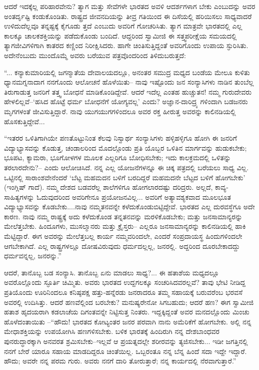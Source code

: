 ಆದರೆ ಇದಕ್ಕೆಲ್ಲ ಪರಿಹಾರವೇನು? ತ್ಯಾಗ ಮತ್ತು ಸೇವೆಗಳೇ ಭಾರತದ ಅವಳಿ ಆದರ್ಶಗಳಾಗ ಬೇಕು ಎಂಬುದನ್ನು ಅವರ ಅಂತರ್ದೃಷ್ಟಿ ಕಂಡುಕೊಂಡಿತು. ರಾಷ್ಟ್ರದ ಜೀವನದಿಯನ್ನು ತೀವ್ರ ಗತಿಯಿಂದ ಈ ದಿಸೆಯಲ್ಲಿ ಹರಿಯಿಸಲು ಸಾಧ್ಯವಾದರೆ ಉಳಿದುದೆಲ್ಲವೂ ತನ್ನಷ್ಟಕ್ಕೆ ಕೈಗೂಡು ತ್ತದೆ ಎಂಬುದು ಅವರಿಗೆ ಗೋಚರಿಸಿತು. ತ್ಯಾಗ ಮಾತ್ರವೇ ಭಾರತದಲ್ಲಿ ಎಲ್ಲ ಕಾಲಕ್ಕೂ ಚಾಲಕಶಕ್ತಿಯನ್ನು ಪಡೆದುಕೊಂಡು ಬಂದಿದೆ. ಆದ್ದರಿಂದ ಸ್ವಾಮೀಜಿ ಈ ಸತ್ತ್ವಪರೀಕ್ಷೆಯ ಸಮಯದಲ್ಲಿ ತ್ಯಾಗಜೀವಿಗಳಿಗಾಗಿ ಕಾತರದ ಕಣ್ಣಿಂದ ನಿರೀಕ್ಷಿಸಿದರು. ಹಾಗೇ ಚಿಂತಿಸುತ್ತಿದ್ದಂತೆ ಅವರಿಗೊಂದು ಉಪಾಯ ಸ್ಫುರಿಸಿತು. ಅದೇನೆಂಬುದು ಮುಂದೊಮ್ಮೆ ಅವರು ಬರೆಯುವ ಪತ್ರವೊಂದರಿಂದ ತಿಳಿದುಬರುತ್ತದೆ:

“... ಕನ್ಯಾಕುಮಾರಿಯಲ್ಲಿ ಜಗನ್ಮಾತೆಯ ದೇವಾಲಯದಲ್ಲೂ, ಅನಂತರ ಸಮುದ್ರ ಮಧ್ಯದ ಬಂಡೆಯ ಮೇಲೂ ಕುಳಿತು ಧ್ಯಾನಮಗ್ನನಾದಾಗ ನನಗೊಂದು ಆಲೋಚನೆ ಹೊಳೆಯಿತು– ನಾವು ಇಷ್ಟೊಂದು ಜನ ಸಂನ್ಯಾಸಿಗಳು ನಾಡಿನ ತುಂಬೆಲ್ಲ ತಿರುಗಾಡುತ್ತ ಜನರಿಗೆ ತತ್ತ್ವ ಬೋಧನೆ ಮಾಡಿಕೊಂಡಿದ್ದೇವೆ. ಆದರೆ ಇದೆಲ್ಲ ಎಂತಹ ಹುಚ್ಚುತನ! ನಮ್ಮ ಗುರುದೇವರು ಹೇಳಲಿಲ್ಲವೆ–‘ಹಸಿದ ಹೊಟ್ಟೆ ಧರ್ಮ ಬೋಧನೆಗೆ ಯೋಗ್ಯವಲ್ಲ’ ಎಂದು? ಅಜ್ಞಾನ-ದಾರಿದ್ರ್ಯ ಗಳಿಂದಾಗಿ ಬಡಜನರು ಮೃಗಗಳಂತೆ ಜೀವಿಸುತ್ತಿದ್ದಾರೆ. ನಾವು ಯುಗಯುಗಗಳಿಂದಲೂ ಅವರ ರಕ್ತ ಹೀರುತ್ತ ಅವರನ್ನು ಕಾಲಿನಡಿಯಲ್ಲಿ ಹೊಸಕುತ್ತಿದ್ದೇವೆ...

“ಇತರರ ಒಳಿತಿಗಾಗಿಯೇ ಪಣತೊಟ್ಟುನಿಂತ ಕೆಲವು ನಿಸ್ವಾರ್ಥ ಸಂನ್ಯಾಸಿಗಳು ಹಳ್ಳಿಹಳ್ಳಿಗೂ ಹೋಗಿ ಈ ಜನರಿಗೆ ವಿದ್ಯಾಭ್ಯಾಸವನ್ನು ಕೊಡುತ್ತ, ಚಂಡಾಲರಿಂದ ಮೊದಲ್ಗೊಂಡು ಪ್ರತಿ ಯೊಬ್ಬರ ಒಳಿತಿನ ಮಾರ್ಗವನ್ನು ಹುಡುಕಬೇಕು; ಭೂಪಟ, ಕ್ಯಾಮರಾ, ಭೂಗೋಳಗಳ ಮೂಲಕ ಎಲ್ಲರಿಗೂ ಬೋಧಿಸಬೇಕು; ಇದು ಕಾಲಕ್ರಮದಲ್ಲಿ ಒಳಿತನ್ನು ತರಲಾರದೇನು?– ಎಂದು ಆಲೋಚಿಸಿದೆ. ನನ್ನ ಎಲ್ಲ ಯೋಜನೆಗಳನ್ನೂ ಈ ಚಿಕ್ಕ ಪತ್ರದಲ್ಲಿ ಬರೆಯಲು ಸಾಧ್ಯ ವಿಲ್ಲ. ಒಟ್ಟಿನಲ್ಲಿ ಸಾರಾಂಶವೇನೆಂದರೆ ‘ಬೆಟ್ಟ ಮಹಮದನ ಬಳಿಗೆ ಬರದಿದ್ದರೆ ಮಹಮದನೇ ಬೆಟ್ಟದ ಬಳಿಗೆ ಹೋಗಬೇಕು’ (ಇಂಗ್ಲಿಷ್ ಗಾದೆ). ನಮ್ಮ ದೇಶದ ಬಡವರೆಲ್ಲ ಶಾಲೆಗಳಿಗೂ ಹೋಗಲಾರದಷ್ಟು ದರಿದ್ರರು. ಅಲ್ಲದೆ, ಕಾವ್ಯ-ಸಾಹಿತ್ಯಗಳನ್ನು ಓದುವುದರಿಂದ ಅವರಿಗೇನೂ ಪ್ರಯೋಜನವಿಲ್ಲ... ಅವರಿಗೆ ಅತ್ಯಾವಶ್ಯಕವಾದ ಮೂಲಭೂತ ವಿದ್ಯಾಭ್ಯಾಸವನ್ನು ಕೊಡಬೇಕು....ನಾವು ನಮ್ಮತನವನ್ನೇ ಕಳೆದುಕೊಂಡುಬಿಟ್ಟಿದ್ದೇವೆ. ಭಾರತದ ಎಲ್ಲ ದುರವಸ್ಥೆಗೂ ಅದೇ ಕಾರಣ. ನಾವು ನಮ್ಮ ರಾಷ್ಟ್ರಕ್ಕೆ ಅದು ಕಳೆದುಕೊಂಡ ತನ್ನತನವನ್ನು ಮರಳಿಕೊಡಬೇಕು; ಮತ್ತು ಜನಸಾಮಾನ್ಯರನ್ನು ಮೇಲೆತ್ತಬೇಕು. ಹಿಂದೂಗಳು, ಮುಸಲ್ಮಾನರು ಮತ್ತು ಕ್ರೈಸ್ತರು– ಎಲ್ಲರೂ ಜನಸಾಮಾನ್ಯರನ್ನು ಕಾಲಿನಡಿಯಲ್ಲಿ ಹಾಕಿ ಮೆಟ್ಟಿದ್ದಾರೆ. ಈಗ ಅವರನ್ನು ಮೇಲೆತ್ತಬಲ್ಲ ಕಾರ್ಯ ನಮ್ಮವರಿಂದಲೇ, ಎಂದರೆ ಸಂಪ್ರದಾಯಸ್ಥ ಹಿಂದುಗಳಿಂದಲೇ ಆಗಬೇಕಾಗಿದೆ. ಎಲ್ಲ ರಾಷ್ಟ್ರಗಳಲ್ಲೂ ದೋಷವಿರುವುದು ಧರ್ಮದಲ್ಲಲ್ಲ, ಜನರಲ್ಲಿ. ಅದ್ದರಿಂದ ದೂರಬೇಕಾದದ್ದು ಧರ್ಮವನ್ನಲ್ಲ, ಜನರನ್ನು.”

ಆದರೆ, ತಾನೊಬ್ಬ ಬಡ ಸಂನ್ಯಾಸಿ. ತಾನೊಬ್ಬ ಏನು ಮಾಡಲು ಸಾಧ್ಯ?... ಈ ಹತಾಶೆಯ ಮಧ್ಯದಲ್ಲೂ ಅವರೊಲ್ಲೊಂದು ಸ್ಫೂರ್ತಿ ಚಿಮ್ಮಿತು. ಅವರು ಭಾರತದ ಉದ್ದಗಲಕ್ಕೂ ಸಂಚರಿಸಿದವರಲ್ಲವೆ? ತಾವು ಭೇಟಿ ನೀಡಿದ್ದ ಪ್ರತಿಯೊಂದು ಊರಿನಿಂದಲೂ ಕನಿಷ್ಠಪಕ್ಷ ಹತ್ತು-ಹನ್ನೆರಡು ಜನರಾದರೂ ತಮ್ಮ ಸಹಾಯಕ್ಕೆ ಬರುವರೆಂಬ ಭರವಸೆ ಅವರಲ್ಲಿ ಉದಿಸಿತ್ತು. ಆದರೆ ಹಣವೆಲ್ಲಿಂದ ಬರಬೇಕು? ಮನುಷ್ಯರೇನೋ ಸಿಗಬಹುದು; ಆದರೆ ಹಣ? ಈಗ ಸ್ವಾಮೀಜಿ ಹತಾಶ ಹೃದಯರಾಗಿ ಕಡಲಾಚೆಯ ದಿಗಂತವನ್ನೇ ನಿಟ್ಟಿಸುತ್ತ ನಿಂತರು. ಇದ್ದಕ್ಕಿದ್ದಂತೆ ಅವರ ಮನದಲ್ಲೊಂದು ಮಿಂಚು ಹೊಳೆದಂತಾಯಿತು –“ಹೌದು! ಭಾರತದ ಕೋಟ್ಯಂತರ ಜನರ ಪರವಾಗಿ ನಾನು ಅಮೆರಿಕೆಗೆ ಹೋಗಬೇಕು. ಅಲ್ಲಿ ನನ್ನ ಮೇಧಾಶಕ್ತಿಯನ್ನು ಉಪಯೋಗಿಸಿ ಹಣಗಳಿಸಬೇಕು. ಬಳಿಕ ಭಾರತಕ್ಕೆ ಹಿಂದಿರುಗಿ ನನ್ನ ದೇಶಬಾಂಧವರ ಪುನರುದ್ಧಾರಕ್ಕಾಗಿ ಅನವರತ ಶ್ರಮಿಸಬೇಕು–ಇಲ್ಲವೆ ಆ ಪ್ರಯತ್ನದಲ್ಲೇ ಶರೀರವನ್ನು ತ್ಯಜಿಸಬೇಕು... ಇಡೀ ಜಗತ್ತಿನಲ್ಲಿ ನನಗೆ ಬೇರೆ ಯಾರೂ ಸಹಾಯ ಮಾಡದಿದ್ದರೂ ಚಿಂತೆಯಿಲ್ಲ. ಒಬ್ಬರಂತೂ ನನ್ನ ಬೆನ್ನ ಹಿಂದೆ ಸದಾ ಇದ್ದೇ ಇದ್ದಾರೆ. ಹೌದು; ಅವರೇ ನನ್ನ ಪರಮ ಗುರು. ಅವರು ನನಗೆ ದಾರಿ ತೋರುತ್ತಾರೆ; ನನ್ನ ಕಾರ್ಯದಲ್ಲಿ ನೆರವಾಗುತ್ತಾರೆ.”

